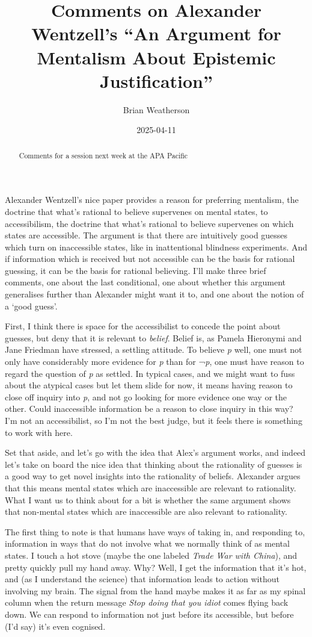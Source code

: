 \documentclass[
  11pt,
  letterpaper,
  DIV=11,
  numbers=noendperiod,
  twoside]{scrartcl}
\title{Comments on Alexander Wentzell's ``An Argument for Mentalism
About Epistemic Justification''}
\author{Brian Weatherson}
\date{2025-04-11}
\begin{document}
\maketitle
\begin{abstract}
Comments for a session next week at the APA Pacific
\end{abstract}


Alexander Wentzell's nice paper provides a reason for preferring
mentalism, the doctrine that what's rational to believe supervenes on
mental states, to accessibilism, the doctrine that what's rational to
believe supervenes on which states are accessible. The argument is that
there are intuitively good guesses which turn on inaccessible states,
like in inattentional blindness experiments. And if information which is
received but not accessible can be the basis for rational guessing, it
can be the basis for rational believing. I'll make three brief comments,
one about the last conditional, one about whether this argument
generalises further than Alexander might want it to, and one about the
notion of a `good guess'.

First, I think there is space for the accessibilist to concede the point
about guesses, but deny that it is relevant to \emph{belief}. Belief is,
as Pamela Hieronymi and Jane Friedman have stressed, a settling
attitude. To believe \emph{p} well, one must not only have considerably
more evidence for \emph{p} than for ¬\emph{p}, one must have reason to
regard the question of \emph{p} as settled. In typical cases, and we
might want to fuss about the atypical cases but let them slide for now,
it means having reason to close off inquiry into \emph{p}, and not go
looking for more evidence one way or the other. Could inaccessible
information be a reason to close inquiry in this way? I'm not an
accessibilist, so I'm not the best judge, but it feels there is
something to work with here.

Set that aside, and let's go with the idea that Alex's argument works,
and indeed let's take on board the nice idea that thinking about the
rationality of guesses is a good way to get novel insights into the
rationality of beliefs. Alexander argues that this means mental states
which are inaccessible are relevant to rationality. What I want us to
think about for a bit is whether the same argument shows that non-mental
states which are inaccessible are also relevant to rationality.

The first thing to note is that humans have ways of taking in, and
responding to, information in ways that do not involve what we normally
think of as mental states. I touch a hot stove (maybe the one labeled
\emph{Trade War with China}), and pretty quickly pull my hand away. Why?
Well, I get the information that it's hot, and (as I understand the
science) that information leads to action without involving my brain.
The signal from the hand maybe makes it as far as my spinal column when
the return message \emph{Stop doing that you idiot} comes flying back
down. We can respond to information not just before its accessible, but
before (I'd say) it's even cognised.
\end{document}
